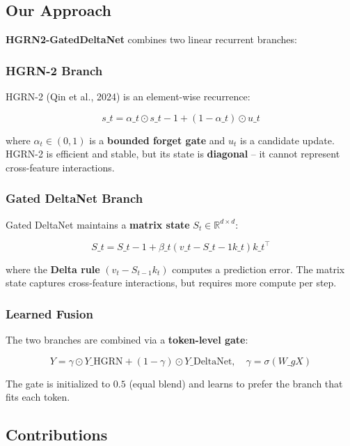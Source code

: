 \subsection{Our Approach}

\textbf{HGRN2-GatedDeltaNet} combines two linear recurrent branches:

\subsubsection{HGRN-2 Branch}

HGRN-2 (Qin et al., 2024) is an element-wise recurrence:

\[
s\_t = \alpha\_t \odot s\_{t-1} + (1 - \alpha\_t) \odot u\_t
\tag{1.1}
\]

where $\alpha_t \in (0, 1)$ is a \textbf{bounded forget gate} and $u_t$ is a 
candidate update. HGRN-2 is efficient and stable, but its state is 
\textbf{diagonal} -- it cannot represent cross-feature interactions.

\subsubsection{Gated DeltaNet Branch}

Gated DeltaNet maintains a \textbf{matrix state} $S_t \in \mathbb{R}^{d \times d}$:

\[
S\_t = S\_{t-1} + \beta\_t (v\_t - S\_{t-1} k\_t) k\_t^\top
\tag{1.2}
\]

where the \textbf{Delta rule} $(v_t - S_{t-1} k_t)$ computes a prediction error. 
The matrix state captures cross-feature interactions, but requires more 
compute per step.

\subsubsection{Learned Fusion}

The two branches are combined via a \textbf{token-level gate}:

\[
Y = \gamma \odot Y\_\text{HGRN} + (1 - \gamma) \odot Y\_\text{DeltaNet}, \quad
\gamma = \sigma(W\_g X)
\tag{1.3}
\]

The gate is initialized to $0.5$ (equal blend) and learns to prefer the 
branch that fits each token.

\subsection{Contributions}

